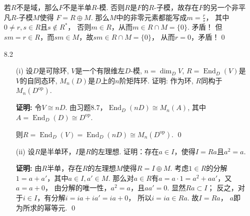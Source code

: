 \begin{enumerate}
            若$R$不是域，那么$F$不是半单$R$-模.
            否则$R$是$F$的$R$-子模，故存在$F$的另一个非平凡$R$-子模$M$使得
            $F = R \oplus M$. 那么$M$中的非零元素都能写成$m=\frac{r}{s}$，
            其中$0 \neq r,s \in R$且$s \notin R^{*}$，
            否则$m \in R$，从而$m \in R \cap M = \{0\}$. 矛盾！
            但$sm=r \in R$，而$sm \in M$，故$sm \in R \cap M = \{0\}$，
            从而$r=0$，矛盾！\qed

        \item[8.2] 
        \begin{itemize}
            \item[(i)] 设$D$是可除环, $V$是一个有限维左$D$-模, 
            $n=\dim_D V$, $R=\operatorname{End}_D(V)$是$V$的自同态环, 
            $M_n(D)$是$D$上的$n$阶矩阵环. 证明: 作为环, 
            $R$同构于$M_n(D^{\operatorname{op}})$.\par
            \item[\textbf{证明:}]
            令$V\cong nD$. 由习题8.7，$\operatorname{End}_{D}(nD)\cong M_{n}(A)$, 
            其中$A=\operatorname{End}_{D}(D) \cong D^{\operatorname{op}}$.\par
            则$R=\operatorname{End}_D(V)=\operatorname{End}_{D}(nD)
            \cong M_n(D^{\operatorname{op}})$. \qed
            \item[(ii)] 设$R$是半单环，$I$是$R$的左理想.
            证明：存在$a \in I$，使得$I = Ra$且$a^{2} = a$.
            \item[\textbf{证明:}]
            由$R$半单，存在$R$的左理想$M$使得$R = I \oplus M$.
            考虑$1 \in R$的分解$1 = a + a'$，其中$a \in I,a' \in M$.
            那么对$a \in R$有$a = a \cdot 1 = a^{2} + aa'$，又$a = a + 0$，
            由分解的唯一性，$a^{2}=a$，且$aa'=0$.
            显然$Ra \subset I$；
            反之，对于$i \in I$，有分解$i = ia + ia' = ia + 0$，
            所以$i=ia \in Ra$. 故$I = Ra$，
            $a$即为所求的幂等元. \qed
        \end{itemize}


\end{enumerate}
